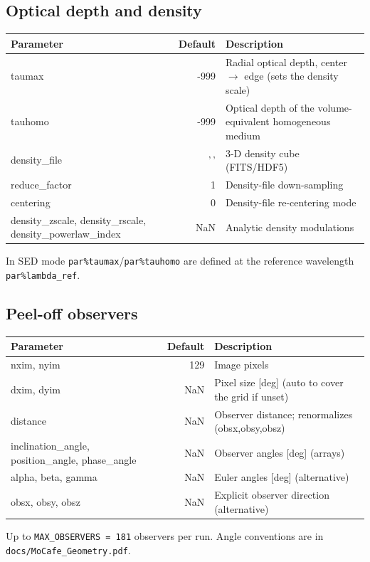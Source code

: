 \documentclass[english,a4paper]{kiseon_memo}
\newcommand{\pp}[1]{\texttt{par\%#1}}
\newcommand{\code}[1]{\texttt{#1}}
\newcommand{\file}[1]{\texttt{#1}}
\begin{document}
\subsection{Optical depth and density}
\begin{longtable}{P D X}
\toprule
\textrm{Parameter} & \textrm{Default} & \textrm{Description}\\
\midrule \endhead
taumax             & -999  & Radial optical depth, center $\to$ edge (sets the density scale)\\
tauhomo            & -999  & Optical depth of the volume-equivalent homogeneous medium\\
density\_file      & '\,'  & 3-D density cube (FITS/HDF5)\\
reduce\_factor     & 1     & Density-file down-sampling\\
centering          & 0     & Density-file re-centering mode\\
density\_zscale, density\_rscale, density\_powerlaw\_index & NaN & Analytic density modulations\\
\bottomrule
\end{longtable}
In SED mode \pp{taumax}/\pp{tauhomo} are defined at the reference wavelength
\pp{lambda\_ref}.

\subsection{Peel-off observers}
\begin{longtable}{P D X}
\toprule
\textrm{Parameter} & \textrm{Default} & \textrm{Description}\\
\midrule \endhead
nxim, nyim         & 129   & Image pixels\\
dxim, dyim         & NaN   & Pixel size [deg] (auto to cover the grid if unset)\\
distance           & NaN   & Observer distance; renormalizes (obsx,obsy,obsz)\\
inclination\_angle, position\_angle, phase\_angle & NaN & Observer angles [deg] (arrays)\\
alpha, beta, gamma & NaN   & Euler angles [deg] (alternative)\\
obsx, obsy, obsz   & NaN   & Explicit observer direction (alternative)\\
\bottomrule
\end{longtable}
Up to \code{MAX\_OBSERVERS = 181} observers per run.  Angle conventions are in
\file{docs/MoCafe\_Geometry.pdf}.
\end{document}
